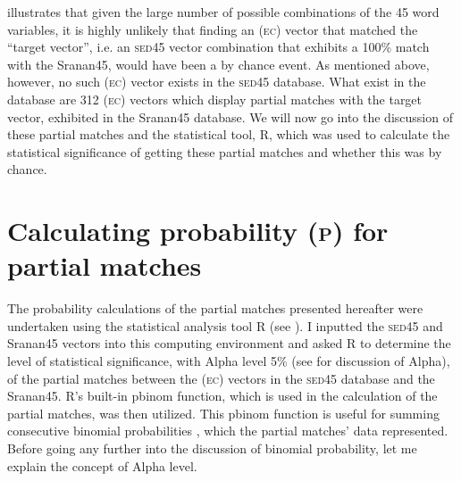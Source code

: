  illustrates that given the large number of possible combinations of the 45 word variables, it is highly unlikely that finding an (\textsc{ec}) vector that matched the ``target vector'', i.e. an \textsc{sed45} vector combination that exhibits a 100\% match with the Sranan45, would have been a by chance event. As mentioned above, however, no such (\textsc{ec}) vector exists in the  \textsc{sed45} database. What exist in the database are 312 (\textsc{ec}) vectors which display partial matches with the target vector, exhibited in the Sranan45 database. We will now go into the discussion of these partial matches and the statistical tool, R, which was used to calculate the statistical significance of getting these partial matches and whether this was by chance.

\section{Calculating probability (\textsc{p}) for partial matches}\label{4.2}
The probability calculations of the partial matches presented hereafter were undertaken using the statistical analysis tool R (see ). I inputted the \textsc{sed45} and Sranan45 vectors into this computing environment and asked R to determine the level of statistical significance, with Alpha level 5\% (see  for discussion of Alpha), of the partial matches between the (\textsc{ec}) vectors in the \textsc{sed45} database and the Sranan45. R's built-in pbinom function, which is used in the calculation of the partial matches, was then utilized. This pbinom function is useful for summing consecutive binomial probabilities \citep{Stats}, which the partial matches' data represented. Before going any further into the discussion of binomial probability, let me explain the concept of
Alpha level.


